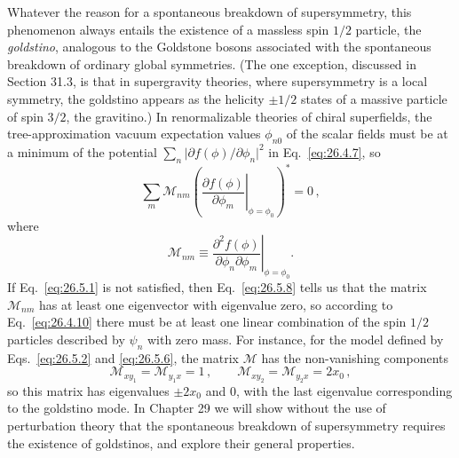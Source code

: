 Whatever the reason for a spontaneous breakdown of supersymmetry, this
phenomenon always entails the existence of a massless spin $1/2$ particle,
the \textit{goldstino}, analogous to the Goldstone bosons associated with the
spontaneous breakdown of ordinary global symmetries. (The one exception,
discussed in Section 31.3, is that in supergravity theories, where
supersymmetry is a local symmetry, the goldstino appears as the helicity
$\pm1/2$ states of a massive particle of spin $3/2$, the gravitino.) In
renormalizable theories of chiral superfields, the tree-approximation vacuum
expectation values $\phi_{n0}$ of the scalar fields must be at a minimum of
the potential $\sum_n\lvert\partial f(\phi)/\partial\phi_n\rvert^2$ in
Eq.~\eqref{eq:26.4.7}, so
\begin{equation}
  \sum_m \mathcal{M}_{nm}
  \left(
    \left.
    \frac{\partial f(\phi)}{\partial\phi_m}
    \right|_{\phi=\phi_0}
  \right)^*=0\,,
  \tag{26.5.8}\label{eq:26.5.8}
\end{equation}
where
\begin{equation}
  \mathcal{M}_{nm}\equiv
  \left.
  \frac{\partial^2f(\phi)}{\partial\phi_n\partial\phi_m}
  \right|_{\phi=\phi_0}.
  \tag{26.5.9}\label{eq:26.5.9}
\end{equation}
If Eq.~\eqref{eq:26.5.1} is not satisfied, then Eq.~\eqref{eq:26.5.8} tells
us that the matrix $\mathcal{M}_{nm}$ has at least one eigenvector with
eigenvalue zero, so according to Eq.~\eqref{eq:26.4.10} there must be at
least one linear combination of the spin $1/2$ particles described by
$\psi_n$ with zero mass. For instance, for the model defined by
Eqs.~\eqref{eq:26.5.2} and \eqref{eq:26.5.6}, the matrix $\mathcal{M}$ has the
non-vanishing components
\begin{equation}
  \mathcal{M}_{xy_1}=\mathcal{M}_{y_1x}=1\,,
  \qquad
  \mathcal{M}_{xy_2}=\mathcal{M}_{y_2x}=2x_0\,,
  \tag{26.5.10}\label{eq:26.5.10}
\end{equation}
so this matrix has eigenvalues $\pm2x_0$ and 0, with the last eigenvalue
corresponding to the goldstino mode. In Chapter 29 we will show without the
use of perturbation theory that the spontaneous breakdown of supersymmetry
requires the existence of goldstinos, and explore their general properties.
